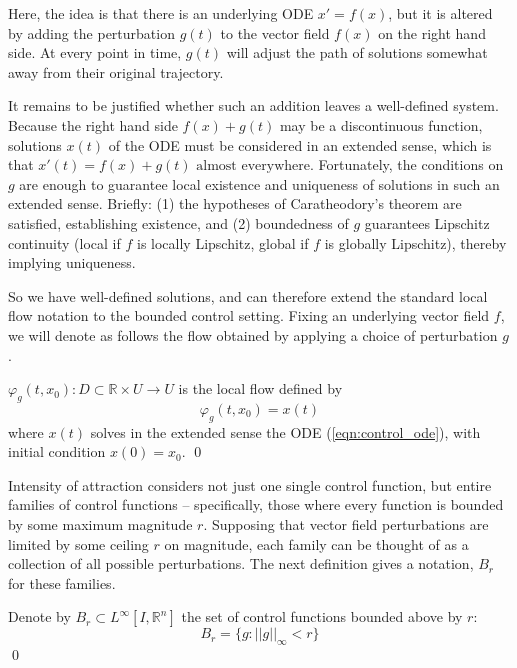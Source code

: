 Here, the idea is that there is an underlying ODE $x'=f(x)$, but it is altered by adding the perturbation $g(t)$ to the vector field $f(x)$ on the right hand side. At every point in time, $g(t)$ will adjust the path of solutions somewhat away from their original trajectory. 

It remains to be justified whether such an addition leaves a well-defined system. Because the right hand side $f(x) + g(t)$ may be a discontinuous function, solutions $x(t)$ of the ODE must be considered in an extended sense, which is that $x'(t) = f(x) + g(t) \text{ almost everywhere.}$ Fortunately, the conditions on $g$ are enough to guarantee local existence and uniqueness of solutions in such an extended sense. Briefly: (1) the hypotheses of Caratheodory's theorem are satisfied, establishing existence, and (2) boundedness of $g$ guarantees Lipschitz continuity (local if $f$ is locally Lipschitz, global if $f$ is globally Lipschitz), thereby implying uniqueness. 

So we have well-defined solutions, and can therefore extend the standard local flow notation to the bounded control setting. Fixing an underlying vector field $f$, we will denote as follows the flow obtained by applying a choice of perturbation $g$.

\begin{definition} 
	$\varphi_g(t, x_0): D \subset \mathbb{R} \times U \to U$ is the local flow defined by $$\varphi_g(t, x_0) = x(t)$$ where $x(t)$ solves in the extended sense the ODE (\ref{eqn:control_ode}), with initial condition $x(0) = x_0$. \qed
\end{definition}

Intensity of attraction considers not just one single control function, but entire families of control functions -- specifically, those where every function is bounded by some maximum magnitude $r$. Supposing that vector field perturbations are limited by some ceiling $r$ on magnitude, each family can be thought of as a collection of all possible perturbations. The next definition gives a notation, $B_r$ for these families.


\begin{definition}
	Denote by $B_r \subset L^\infty[I, \mathbb{R}^n]$ the set of control functions bounded above by $r$:
	$$B_r = \{g  : ||g||_\infty < r\}$$ \qed
\end{definition}


